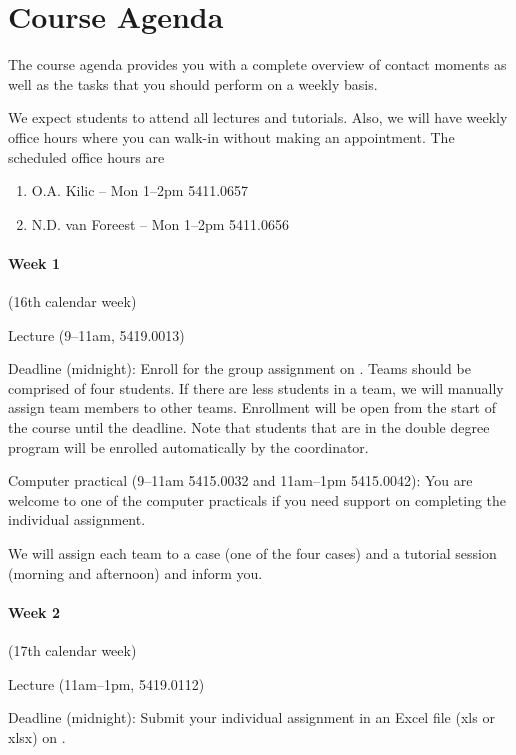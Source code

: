 \documentclass{article}
\begin{document}
\section{Course Agenda}
\label{sec:agenda}

The course agenda provides you with a complete overview of contact moments as well as the tasks that you should perform on a weekly basis. 

We expect students to attend all lectures and tutorials. Also, we will have weekly office hours where you can walk-in without making an appointment. The scheduled office hours are 
\begin{enumerate}
\item O.A. Kilic -- Mon 1--2pm 5411.0657
\item N.D. van Foreest -- Mon 1--2pm 5411.0656
\end{enumerate}

\vspace{.5cm}
\paragraph{Week 1} {\footnotesize (16th calendar week)}
\begin{description}[font=\normalfont\itshape,leftmargin=!,labelwidth=2cm]
\item[Tue 18/4] Lecture (9--11am, 5419.0013)
\item[Thu 20/4] Deadline (midnight): Enroll for the group assignment on \nestor. Teams should be comprised of four students. If there are less students in a team, we will manually assign team members to other teams. Enrollment will be open from the start of the course until the deadline. Note that students that are in the double degree program will be enrolled automatically by the coordinator. 
\item[Fri 21/4] Computer practical (9--11am 5415.0032 and 11am--1pm 5415.0042): You are welcome to one of the computer practicals if you need support on completing the individual assignment.
\item[Fri 21/4] We will assign each team to a case (one of the four cases) and a tutorial session (morning and afternoon) and inform you.
\end{description}

\paragraph{Week 2} {\footnotesize (17th calendar week)}
\begin{description}[font=\normalfont\itshape,leftmargin=!,labelwidth=2cm]
\item[Mon 24/4] Lecture (11am--1pm, 5419.0112)
\item[Wed 26/4] Deadline (midnight): Submit your individual assignment in an Excel file (xls or xlsx) on \nestor. 
\end{description}
\end{document}
